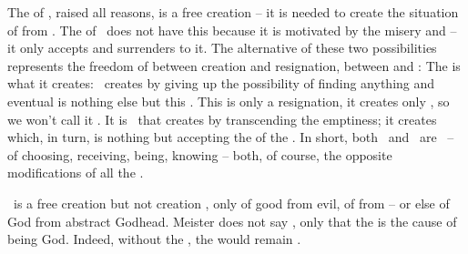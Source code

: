 The  of \yes, raised  all  reasons, is a free
creation -- it is needed to create the situation of  from
.  The  of \No\ does not have this  because
it is motivated by the  misery and  -- it only
accepts and surrenders to it. The alternative of these two possibilities
represents the  freedom of  between creation and
resignation, between  and :  The  is what it
creates:   \No\ creates
 by giving up the possibility of finding anything and eventual
 is nothing else but this \No. This is only a resignation, it
creates only , so we won't call it .
It is \Yes\ that creates by transcending the emptiness; it creates  which, in turn, is nothing but accepting the  of the
.  In short, both \Yes\ and \No\ are \nexuss\ -- of choosing,
receiving, being, knowing -- both, of course,  the opposite
 modifications of all the .

\label{pa:GodneedsMe}
\Yes\ is a free creation but not creation , only
of good from evil, of 
 from  -- or else of  God from abstract
Godhead.   Meister does 
not say , only that the  is the cause of
 being God. Indeed, without the , the
 would remain .

